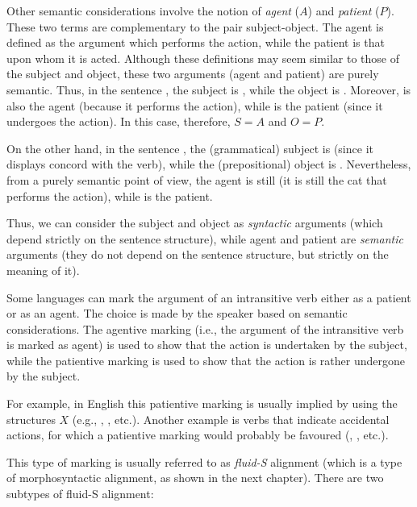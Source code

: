 \begin{refsection}
Other semantic considerations involve the notion of \textit{agent} ($A$) and \textit{patient} ($P$). These two terms are complementary to the pair subject-object. The agent is defined as the argument which performs the action, while the patient is that upon whom it is acted. Although these definitions may seem similar to those of the subject and object, these two arguments (agent and patient) are purely semantic. Thus, in the sentence , the subject is , while the object is . Moreover,  is also the agent (because it performs the action), while  is the patient (since it undergoes the action). In this case, therefore, $S = A$ and $O = P$.

On the other hand, in the sentence , the (grammatical) subject is  (since it displays concord with the verb), while the (prepositional) object is . Nevertheless, from a purely semantic point of view, the agent is still  (it is still the cat that performs the action), while  is the patient.

Thus, we can consider the subject and object as \emph{syntactic} arguments (which depend strictly on the sentence structure), while agent and patient are \emph{semantic} arguments (they do not depend on the sentence structure, but strictly on the meaning of it).

Some languages can mark the argument of an intransitive verb either as a patient or as an agent. The choice is made by the speaker based on semantic considerations. The agentive marking (i.e., the argument of the intransitive verb is marked as agent) is used to show that the action is undertaken by the subject, while the patientive marking is used to show that the action is rather undergone by the subject.

For example, in English this patientive marking is usually implied by using the structures  $X$ (e.g., , , etc.). Another example is verbs that indicate accidental actions, for which a patientive marking would probably be favoured (, , etc.).

This type of marking is usually referred to as \emph{fluid-S} alignment (which is a type of morphosyntactic alignment, as shown in the next chapter). There are two subtypes of fluid-S alignment:


\end{refsection}
